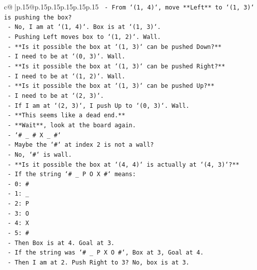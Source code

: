 \documentclass{article}
\begin{document}
{\begin{supertabular}{c@{$\;$}|p{.15\linewidth}@{}p{.15\linewidth}p{.15\linewidth}p{.15\linewidth}p{.15\linewidth}p{.15\linewidth}}
{{{\texttt{          {-} From `(1, 4)`, move **Left** to `(1, 3)` is pushing the box?} \\
\texttt{          {-} No, I am at `(1, 4)`. Box is at `(1, 3)`.} \\
\texttt{          {-} Pushing Left moves box to `(1, 2)`. Wall.} \\
\texttt{          {-} **Is it possible the box at `(1, 3)` can be pushed Down?**} \\
\texttt{          {-} I need to be at `(0, 3)`. Wall.} \\
\texttt{          {-} **Is it possible the box at `(1, 3)` can be pushed Right?**} \\
\texttt{          {-} I need to be at `(1, 2)`. Wall.} \\
\texttt{          {-} **Is it possible the box at `(1, 3)` can be pushed Up?**} \\
\texttt{          {-} I need to be at `(2, 3)`.} \\
\texttt{          {-} If I am at `(2, 3)`, I push Up to `(0, 3)`. Wall.} \\
\texttt{          {-} **This seems like a dead end.**} \\
\texttt{          {-} **Wait**, look at the board again.} \\
\texttt{          {-} `\# \_ \# X \_ \#`} \\
\texttt{          {-} Maybe the `\#` at index 2 is not a wall?} \\
\texttt{          {-} No, `\#` is wall.} \\
\texttt{          {-} **Is it possible the box at `(4, 4)` is actually at `(4, 3)`?**} \\
\texttt{          {-} If the string `\# \_ P O X \#` means:} \\
\texttt{            {-} 0: \#} \\
\texttt{            {-} 1: \_} \\
\texttt{            {-} 2: P} \\
\texttt{            {-} 3: O} \\
\texttt{            {-} 4: X} \\
\texttt{            {-} 5: \#} \\
\texttt{          {-} Then Box is at 4. Goal at 3.} \\
\texttt{          {-} If the string was `\# \_ P X O \#`, Box at 3, Goal at 4.} \\
\texttt{          {-} Then I am at 2. Push Right to 3? No, box is at 3.} \\
}}}
\end{supertabular}}
\end{document}
